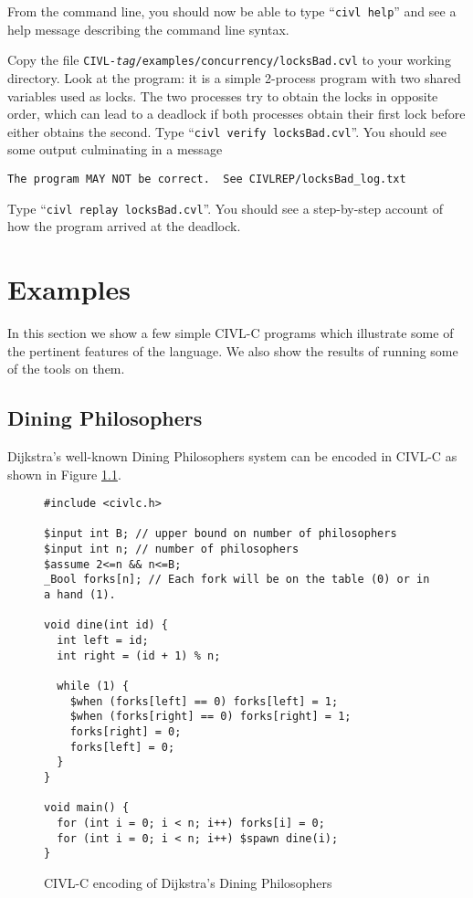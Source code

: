 From the command line, you should now be able to type ``\texttt{civl
  help}'' and see a help message describing the command line syntax.

Copy the file
\texttt{CIVL-\textit{tag}/examples/concurrency/locksBad.cvl} to your
working directory.  Look at the program: it is a simple 2-process
program with two shared variables used as locks.  The two processes
try to obtain the locks in opposite order, which can lead to a
deadlock if both processes obtain their first lock before either
obtains the second.  Type
``\verb!civl verify locksBad.cvl!''.  You should see some output
culminating in a message
\begin{verbatim}
The program MAY NOT be correct.  See CIVLREP/locksBad_log.txt
\end{verbatim}

Type ``\verb!civl replay locksBad.cvl!''.  You should see a
step-by-step account of how the program arrived at the deadlock.


\chapter{Examples}

In this section we show a few simple CIVL-C programs which illustrate
some of the pertinent features of the language. We also show the results
of running some of the tools on them.

\section{Dining Philosophers}

Dijkstra's well-known Dining Philosophers system can be encoded in
CIVL-C as shown in Figure \ref{fig:dining}.

\begin{figure}[t]
  \begin{small}
\begin{verbatim}
#include <civlc.h>

$input int B; // upper bound on number of philosophers
$input int n; // number of philosophers
$assume 2<=n && n<=B;
_Bool forks[n]; // Each fork will be on the table (0) or in a hand (1). 

void dine(int id) {
  int left = id;
  int right = (id + 1) % n;

  while (1) {
    $when (forks[left] == 0) forks[left] = 1;
    $when (forks[right] == 0) forks[right] = 1;
    forks[right] = 0;
    forks[left] = 0;
  }
}

void main() {
  for (int i = 0; i < n; i++) forks[i] = 0;
  for (int i = 0; i < n; i++) $spawn dine(i);
}
\end{verbatim}
  \end{small}
  \caption{CIVL-C encoding of Dijkstra's Dining Philosophers}
  \label{fig:dining}
\end{figure}

